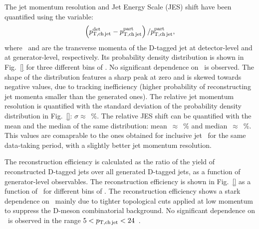 \documentclass[a4paper]{jpconf}
\begin{document}
The jet momentum resolution and Jet Energy Scale (JES) shift have been quantified using the variable: 
\begin{equation}
\left( p_{\mathrm{T,ch\,jet}}^{\mathrm{det}} - p_{\mathrm{T,ch\,jet}}^{\mathrm{part}} \right) / p_{\mathrm{T,ch\,jet}}^{\mathrm{part}}, 
\end{equation}
where \ptchjetdet\ and \ptchjetgen are the transverse momenta of the D-tagged jet at detector-level and at generator-level, respectively.
Its probability density distribution is shown in Fig.~\ref{} for three different bins of \ptchjetgen. No significant dependence on \ptchjetgen\ is observed.
The shape of the distribution features a sharp peak at zero and is skewed towards negative values, due to tracking inefficiency (higher probability of
reconstructing jet momenta smaller than the generated ones). The relative jet momentum resolution is quantified with the standard deviation
of the probability density distribution in Fig.~\ref{}: $\sigma\approx$~\%. The relative JES shift can be quantified with the mean and the median of the same distribution:
mean~$\approx$~\% and median~$\approx$~\%. This values are comaprable to the ones obtained for inclusive jet~\cite{} for the same data-taking period, with a slightly better jet momentum resolution.

The reconstruction efficiency is calculated as the ratio of the yield of reconstructed D-tagged jets over all generated D-tagged jets, as a function of generator-level observables.
The reconstruction efficiency is shown in Fig.~\ref{} as a function of \ptd\ for different bins of \ptchjet. The reconstruction efficiency shows a stark dependence on \ptd\ mainly due to
tighter topological cuts applied at low momentum to suppress the D-meson combinatorial background. No significant dependence on \ptchjet\ is observed in the range $5<p_{\mathrm{T,ch\, jet}}<24$~\GeVc.
\end{document}
